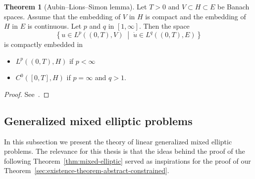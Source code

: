 \documentclass[a4paper,10pt,twoside]{amsbook}
\numberwithin{section}{chapter}
\numberwithin{equation}{chapter}
\theoremstyle{definition}
\newtheorem{thm}[prop]{Theorem}
\begin{document}
\begin{thm}[Aubin--Lions--Simon lemma]
\label{thm:aubin-lions}
Let $T>0$ and $V\subset H\subset E$ be Banach spaces. Assume that the embedding of $V$ in $H$ is compact and the embedding of $H$ in $E$ is continuous. Let $p$ and $q$ in $[1,\infty]$. Then the space
\[
\left\{u\in L^p((0,T),V)\;\middle|\;\dot u\in L^q((0,T),E)\right\}
\]
is compactly embedded in
\begin{itemize}
\item[(i)] $L^p((0,T),H)$ if $p<\infty$
\item[(ii)] $C^0([0,T],H)$ if $p=\infty$ and $q>1$.
\end{itemize}
\end{thm}
\begin{proof}
See~\cite[Theorem~II.5.16]{math-tool-ns}.
\end{proof}

\subsection{Generalized mixed elliptic problems}

In this subsection we present the theory of linear generalized mixed elliptic problems. The relevance for this thesis is that the ideas behind the proof of the following Theorem~\ref{thm:mixed-elliptic} served as inspirations for the proof of our Theorem~\ref{sec:existence-theorem-abstract-constrained}.
\end{document}

